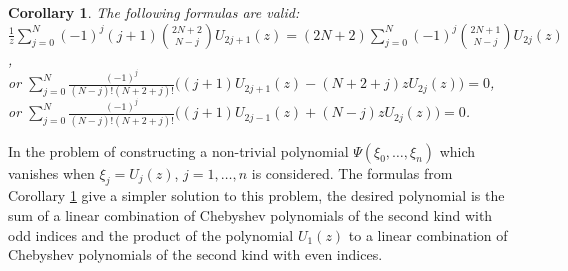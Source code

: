 \documentclass[12pt]{article}
\newtheorem{corollary}[thm]{Corollary}
\newcommand{\pa}[1]{\left(#1\right)}
\begin{document}

\begin{corollary}\label{cor:2} The following formulas are valid:\\
$\displaystyle \frac{1}{z}\sum_{j = 0}^{N} (-1)^j(j+1) {2N + 2 \choose N - j}U_{2j + 1}(z) = (2N + 2)\sum_{j = 0}^{N} (-1)^j{2N + 1 \choose N - j}U_{2j}(z)$, \\
or
$\displaystyle \sum_{j = 0}^{N}\frac{(-1)^j}{(N - j)!(N + 2 + j)!}\Big((j + 1)U_{2j + 1}(z) - (N + 2 + j)zU_{2j}(z)\Big) = 0$, \\
or
$\displaystyle \sum_{j = 0}^{N}\frac{(-1)^j}{(N - j)!(N + 2 + j)!}\Big((j + 1)U_{2j - 1}(z) + (N - j)zU_{2j}(z)\Big) = 0$.
\end{corollary} 

In \cite{ref13} the problem of constructing a non-trivial polynomial $\Psi\pa{\xi_0,\ldots,\xi_n}$ which vanishes when $\xi_j = U_j(z)$, $j = 1, \ldots, n$ is considered.
The formulas from Corollary \ref{cor:2} give a simpler solution to this problem, the desired polynomial is the sum of a linear combination of Chebyshev polynomials of the second kind with odd indices and the product of the polynomial $U_1(z)$ to a linear combination of Chebyshev polynomials of the second kind with even indices.





\end{document}
